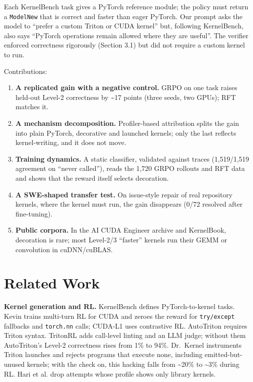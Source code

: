 \documentclass[11pt]{article}
\providecommand{\tightlist}{\setlength{\itemsep}{0pt}\setlength{\parskip}{0pt}}
\begin{document}
Each KernelBench task gives a PyTorch reference module; the policy must return a
\texttt{ModelNew} that is correct and faster than eager PyTorch. Our prompt asks the model
to ``prefer a custom Triton or CUDA kernel'' but, following KernelBench, also says
``PyTorch operations remain allowed where they are useful''. The verifier enforced
correctness rigorously (Section 3.1) but did not require a custom kernel to run.

Contributions:

\begin{enumerate}
\def\labelenumi{\arabic{enumi}.}
\tightlist
\item
  \textbf{A replicated gain with a negative control.} GRPO on one task raises held-out
  Level-2 correctness by \textasciitilde17 points (three seeds, two GPUs); RFT matches it.
\item
  \textbf{A mechanism decomposition.} Profiler-based attribution splits the gain into
  plain PyTorch, decorative and launched kernels; only the last reflects
  kernel-writing, and it does not move.
\item
  \textbf{Training dynamics.} A static classifier, validated against traces (1,519/1,519
  agreement on ``never called''), reads the 1,720 GRPO rollouts and RFT data and shows
  that the reward itself selects decoration.
\item
  \textbf{A SWE-shaped transfer test.} On issue-style repair of real repository kernels,
  where the kernel must run, the gain disappears (0/72 resolved after fine-tuning).
\item
  \textbf{Public corpora.} In the AI CUDA Engineer archive and KernelBook, decoration is
  rare; most Level-2/3 ``faster'' kernels run their GEMM or convolution in cuDNN/cuBLAS.
\end{enumerate}

\section{Related Work}\label{related-work}

\textbf{Kernel generation and RL.} KernelBench \cite{r1} defines PyTorch-to-kernel tasks. Kevin
\cite{r2} trains multi-turn RL for CUDA and zeroes the reward for \texttt{try/\allowbreak{}except} fallbacks and
\texttt{torch.\allowbreak{}nn} calls; CUDA-L1 \cite{r3} uses contrastive RL. AutoTriton \cite{r13} requires Triton
syntax. TritonRL \cite{r14} adds call-level linting and an LLM judge; without them
AutoTriton's Level-2 correctness rises from 1\% to 94\%. Dr.~Kernel \cite{r15} instruments
Triton launches and rejects programs that execute none, including emitted-but-unused
kernels; with the check on, this hacking falls from \textasciitilde20\% to \textasciitilde3\% during RL. Hari et al.
\cite{r16} drop attempts whose profile shows only library kernels.
\end{document}
